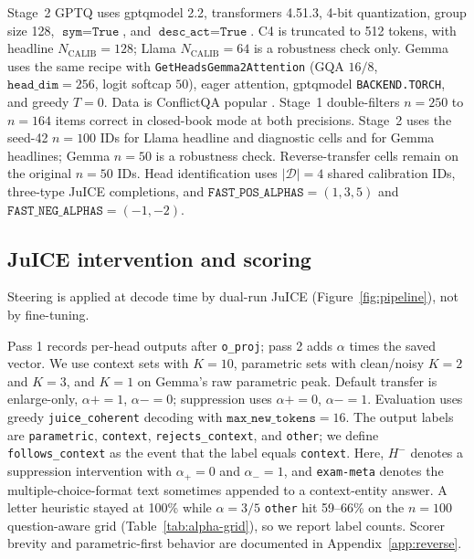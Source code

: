 \documentclass{article} %
\begin{document}
Stage~2 GPTQ uses gptqmodel 2.2, transformers 4.51.3, 4-bit quantization, group size 128, $\texttt{sym}{=}\texttt{True}$, and $\texttt{desc\_act}{=}\texttt{True}$. C4 is truncated to 512 tokens, with headline $N_{\mathrm{CALIB}}{=}128$; Llama $N_{\mathrm{CALIB}}{=}64$ is a robustness check only. Gemma uses the same recipe with \texttt{GetHeadsGemma2Attention} (GQA $16/8$, $\texttt{head\_dim}{=}256$, logit softcap $50$), eager attention, gptqmodel \texttt{BACKEND.TORCH}, and greedy $T{=}0$. Data is ConflictQA popular \citep{xie2024adaptive}. Stage~1 double-filters $n{=}250$ to $n{=}164$ items correct in closed-book mode at both precisions. Stage~2 uses the seed-42 $n{=}100$ IDs for Llama headline and diagnostic cells and for Gemma headlines; Gemma $n{=}50$ is a robustness check. Reverse-transfer cells remain on the original $n{=}50$ IDs. Head identification uses $|\mathcal{D}|{=}4$ shared calibration IDs, three-type JuICE completions, and $\texttt{FAST\_POS\_ALPHAS}{=}(1,3,5)$ and $\texttt{FAST\_NEG\_ALPHAS}{=}(-1,-2)$.

\subsection{JuICE intervention and scoring}

Steering is applied at decode time by dual-run JuICE (Figure~\ref{fig:pipeline}), not by fine-tuning.

Pass 1 records per-head outputs after \texttt{o\_proj}; pass 2 adds $\alpha$ times the saved vector. We use context sets with $K{=}10$, parametric sets with clean/noisy $K{=}2$ and $K{=}3$, and $K{=}1$ on Gemma's raw parametric peak. Default transfer is enlarge-only, $\alpha{+}{=}1$, $\alpha{-}{=}0$; suppression uses $\alpha{+}{=}0$, $\alpha{-}{=}1$. Evaluation uses greedy \texttt{juice\_coherent} decoding with $\texttt{max\_new\_tokens}{=}16$. The output labels are \texttt{parametric}, \texttt{context}, \texttt{rejects\_context}, and \texttt{other}; we define \texttt{follows\_context} as the event that the label equals \texttt{context}. Here, $H^{-}$ denotes a suppression intervention with $\alpha_{+}{=}0$ and $\alpha_{-}{=}1$, and \texttt{exam-meta} denotes the multiple-choice-format text sometimes appended to a context-entity answer. A letter heuristic stayed at 100\% while $\alpha{=}3/5$ \texttt{other} hit 59--66\% on the $n{=}100$ question-aware grid (Table~\ref{tab:alpha-grid}), so we report label counts. Scorer brevity and parametric-first behavior are documented in Appendix~\ref{app:reverse}.
\end{document}
